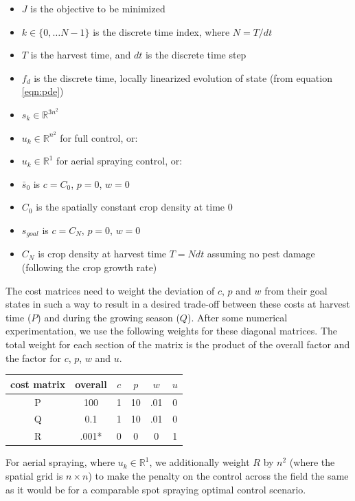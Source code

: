 \documentclass[11pt]{article}
\begin{document}
\begin{itemize}
\setlength\itemsep{-1pt}
\item $J$ is the objective to be minimized
\item $k \in \{0, \dots N-1\}$ is the discrete time index, where $N = T/dt$
\item $T$ is the harvest time, and $dt$ is the discrete time step
\item $f_d$ is the discrete time, locally linearized evolution of state (from equation \ref{eqn:pde})
\item $s_k \in \mathbb{R}^{3n^2}$
\item $u_k \in \mathbb{R}^{n^2}$ for full control, or:
\item $u_k \in \mathbb{R}^{1}$ for aerial spraying control, or:
\item $\bar{s}_0$ is $c = C_0$, $p = 0$, $w = 0$
\item $C_0$ is the spatially constant crop density at time $0$
\item $s_{goal}$ is $c = C_N$, $p = 0$, $w = 0$
\item $C_N$ is crop density at harvest time $T = N dt$ assuming no pest damage (following the crop growth rate)
\end{itemize}

The cost matrices need to weight the deviation of $c$, $p$ and $w$ from their goal states in such a way to result in a desired trade-off between these costs at harvest time ($P$) and during the growing season ($Q$). After some numerical experimentation, we use the following weights for these diagonal matrices. The total weight for each section of the matrix is the product of the overall factor and the factor for $c$, $p$, $w$ and $u$.

\begin{center}
	\begin{tabular}{ | c | c | c | c | c | c | }
	\hline
    cost matrix & overall & $c$ & $p$ & $w$ & $u$ \\
    \hline
    P & 100 & 1 & 10 & .01 & 0 \\
    \hline
    Q & 0.1 & 1 & 10 & .01 & 0 \\
    \hline
    R & .001* & 0 & 0 & 0 & 1 \\
    \hline
    \end{tabular}
\end{center}

For aerial spraying, where $u_k \in \mathbb{R}^{1}$, we additionally weight $R$ by $n^2$ (where the spatial grid is $n \times n$) to make the penalty on the control across the field the same as it would be for a comparable spot spraying optimal control scenario.
\end{document}
